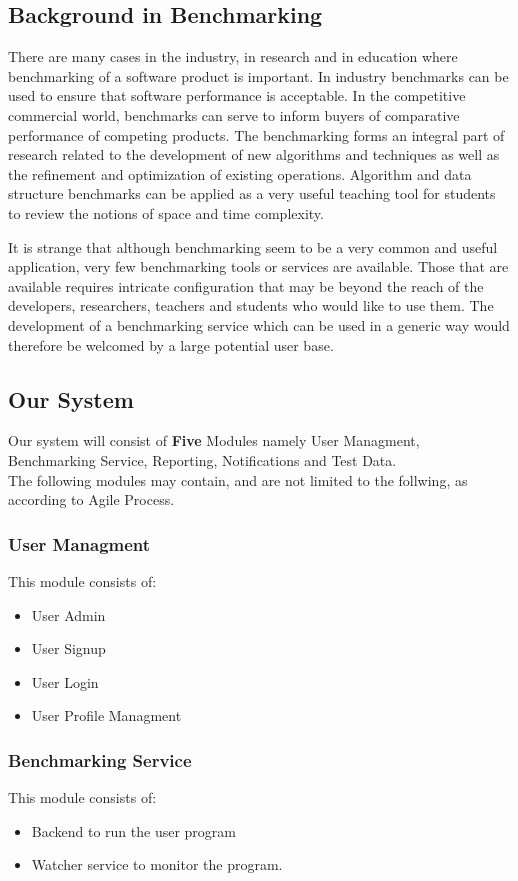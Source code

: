 \subsection{Background in Benchmarking}
There are many cases in the industry, in research and in education where benchmarking of
a software product is important. In industry benchmarks can be used to ensure that software
performance is acceptable. In the competitive commercial world, benchmarks can serve to inform
buyers of comparative performance of competing products. The benchmarking forms an integral
part of research related to the development of new algorithms and techniques as well as the refinement
and optimization of existing operations. Algorithm and data structure benchmarks can be applied
as a very useful teaching tool for students to review the notions of space and time complexity.

It is strange that although benchmarking seem to be a very common and useful application, very few benchmarking tools or services are available. Those that are available requires intricate configuration that may be beyond the reach of the developers, researchers,
teachers and students who would like to use them. The development of a benchmarking service which can be used in a generic way would therefore be welcomed by a large
potential user base.

\subsection{Our System}
Our system will consist of \textbf{Five} Modules namely User Managment, Benchmarking Service, Reporting, Notifications and Test Data.\\
The following modules may contain, and are not limited to the follwing, as according to Agile Process.

\subsubsection{User Managment}
This module consists of:
\begin{itemize}
  \item User Admin
  \item User Signup
  \item User Login
  \item User Profile Managment
\end{itemize}

\subsubsection{Benchmarking Service}
This module consists of:
\begin{itemize}
  \item Backend to run the user program
  \item Watcher service to monitor the program.
\end{itemize}

